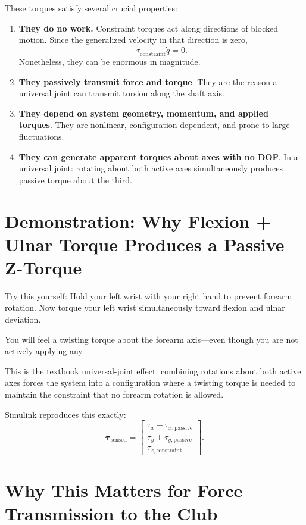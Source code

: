 \documentclass[11pt]{article}
\begin{document}
These torques satisfy several crucial properties:
\begin{enumerate}
    \item \textbf{They do no work.}  
    Constraint torques act along directions of blocked motion.  
    Since the generalized velocity in that direction is zero,
    \[
    \tau_{\text{constraint}}^\top \dot{q} = 0.
    \]
    Nonetheless, they can be enormous in magnitude.
    
    \item \textbf{They passively transmit force and torque}.  
    They are the reason a universal joint can transmit torsion along the shaft axis.

    \item \textbf{They depend on system geometry, momentum, and applied torques}.  
    They are nonlinear, configuration-dependent, and prone to large fluctuations.

    \item \textbf{They can generate apparent torques about axes with no DOF}.  
    In a universal joint: rotating about both active axes simultaneously produces passive torque about the third.
\end{enumerate}

\section{Demonstration: Why Flexion + Ulnar Torque Produces a Passive Z-Torque}

Try this yourself:  
Hold your left wrist with your right hand to prevent forearm rotation.  
Now torque your left wrist simultaneously toward flexion and ulnar deviation.

You will feel a twisting torque about the forearm axis—even though you are not actively applying any.

This is the textbook universal-joint effect: combining rotations about both active axes 
forces the system into a configuration where a twisting torque is needed to maintain the 
constraint that no forearm rotation is allowed.

Simulink reproduces this exactly:
\[
\bm{\tau}_{\text{sensed}} = 
\begin{bmatrix}
\tau_x + \tau_{x,\text{passive}} \\
\tau_y + \tau_{y,\text{passive}} \\
\tau_{z,\text{constraint}}
\end{bmatrix}.
\]

\section{Why This Matters for Force Transmission to the Club}
\end{document}
